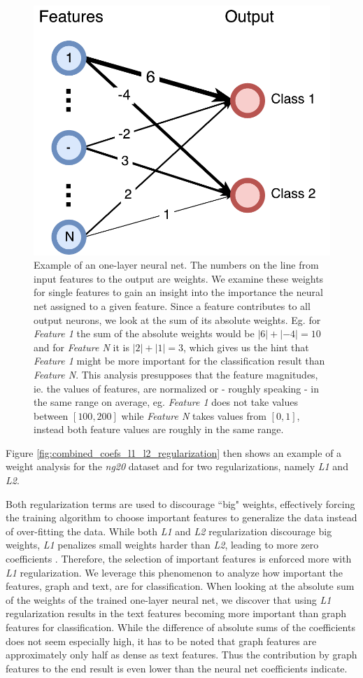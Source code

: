 \begin{figure}[htb!]
    \centering
    {\includegraphics[width=0.5\linewidth]{assets/figures/coefs_example.pdf}%
        \caption[Example: One-layer neural net]{%
            Example of an one-layer neural net. The numbers on the line from input features to the output are weights.
            We examine these weights for single features to gain an insight into the importance the neural net assigned to a given feature. Since a feature contributes to all output neurons, we look at the sum of its absolute weights. Eg. for \textit{Feature 1} the sum of the absolute weights would be $|6| + |-4| = 10$ and for \textit{Feature N} it is $|2| + |1| = 3$, which gives us the hint that \textit{Feature 1} might be more important for the classification result than \textit{Feature N}.
            This analysis presupposes that the feature magnitudes, ie. the values of features, are normalized or - roughly speaking - in the same range on average, eg. \textit{Feature 1} does not take values between $[100, 200]$ while \textit{Feature N} takes values from $[0, 1]$, instead both feature values are roughly in the same range.
        }%
        \label{fig:coefs_example_one_layer}}
\end{figure}

Figure \ref{fig:combined_coefs_l1_l2_regularization} then shows an example of a weight analysis for the \textit{ng20} dataset and for two regularizations, namely \textit{L1} and \textit{L2}.

Both regularization terms are used to discourage ``big" weights, effectively forcing the training algorithm to choose important features to generalize the data instead of over-fitting the data.
While both \textit{L1} and \textit{L2} regularization discourage big weights, \textit{L1} penalizes small weights harder than \textit{L2}, leading to more zero coefficients \cite[p.~13]{Hastie2009}.
Therefore, the selection of important features is enforced more with \textit{L1} regularization.
We leverage this phenomenon to analyze how important the features, graph and text, are for classification.
When looking at the absolute sum of the weights of the trained one-layer neural net, we discover that using \textit{L1} regularization results in the text features becoming more important than graph features for classification.
While the difference of absolute sums of the coefficients does not seem especially high, it has to be noted that graph features are approximately only half as dense as text features.
Thus the contribution by graph features to the end result is even lower than the neural net coefficients indicate.

